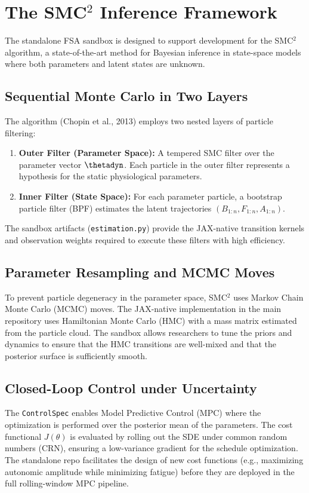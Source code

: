 \section{The SMC${}^2$ Inference Framework}

The standalone FSA sandbox is designed to support development for the SMC${}^2$ algorithm, a state-of-the-art method for Bayesian inference in state-space models where both parameters and latent states are unknown.

\subsection{Sequential Monte Carlo in Two Layers}

The algorithm (Chopin et al., 2013) employs two nested layers of particle filtering:
\begin{enumerate}
    \item \textbf{Outer Filter (Parameter Space):} A tempered SMC filter over the parameter vector $\thetadyn$. Each particle in the outer filter represents a hypothesis for the static physiological parameters.
    \item \textbf{Inner Filter (State Space):} For each parameter particle, a bootstrap particle filter (BPF) estimates the latent trajectories $(B_{1:n}, F_{1:n}, A_{1:n})$.
\end{enumerate}

The sandbox artifacts (\texttt{estimation.py}) provide the JAX-native transition kernels and observation weights required to execute these filters with high efficiency.

\subsection{Parameter Resampling and MCMC Moves}

To prevent particle degeneracy in the parameter space, SMC${}^2$ uses Markov Chain Monte Carlo (MCMC) moves. The JAX-native implementation in the main repository uses Hamiltonian Monte Carlo (HMC) with a mass matrix estimated from the particle cloud. The sandbox allows researchers to tune the priors and dynamics to ensure that the HMC transitions are well-mixed and that the posterior surface is sufficiently smooth.

\subsection{Closed-Loop Control under Uncertainty}

The \texttt{ControlSpec} enables Model Predictive Control (MPC) where the optimization is performed over the posterior mean of the parameters. The cost functional $J(\theta)$ is evaluated by rolling out the SDE under common random numbers (CRN), ensuring a low-variance gradient for the schedule optimization. The standalone repo facilitates the design of new cost functions (e.g., maximizing autonomic amplitude while minimizing fatigue) before they are deployed in the full rolling-window MPC pipeline.
